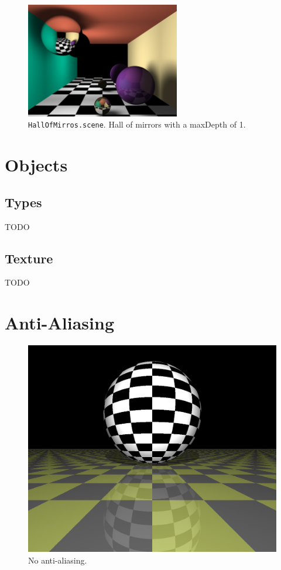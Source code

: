 \documentclass{article}
\begin{document}
\begin{figure}[H]
    \centering
    \includegraphics[width=0.6\textwidth]{./examples/HallOfMirrorsDepth3.png}
    \caption{\texttt{HallOfMirros.scene}. Hall of mirrors with a maxDepth of 1.}
\end{figure}

\section{Objects}

\subsection{Types}

TODO

\subsection{Texture}

TODO

\section{Anti-Aliasing}

\begin{figure}[H]
    \includegraphics[width=\textwidth]{./examples/AntiAliasingComparison/Scene_noAntiAliasing.png}
    \caption{No anti-aliasing.}
\end{figure}
\end{document}
